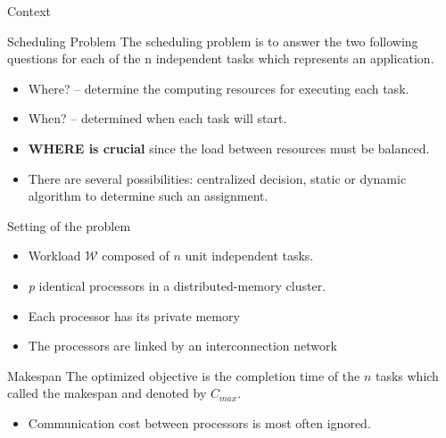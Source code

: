 \documentclass{beamer}
\begin{document}
\begin{frame}{Context}
    \begin{block}{Scheduling Problem}
        The scheduling problem is to answer the two following questions
        for each of the n independent tasks which represents an application.
        \begin{itemize}
            \item \alert{Where?} – determine the computing resources for executing each task.
            \item \alert{When?} – determined when each task will start. 

        \end{itemize}
    \end{block}
\bigskip

    \begin{itemize}
        \item \textbf{WHERE is crucial} since the load between resources must be balanced. 
        \item There are several possibilities: centralized decision, static or dynamic algorithm to determine such an assignment.

    \end{itemize}
\end{frame}




\begin{frame}{Setting of the problem}
    \begin{itemize}
        \item { Workload $\mathcal{W}$ composed of $n$ unit independent tasks.}
        \item { \emph{p} identical processors in a distributed-memory cluster.  }                                     
        \item { Each processor has its private memory}
        \item { The processors are linked by an interconnection network}                                     
    \end{itemize}
        
        \begin{block}{Makespan}
            The optimized objective is the completion time of the $n$ tasks which called the \alert{makespan} and denoted by \alert{$C_{max}$}.
        \end{block}
        
     \begin{itemize}
         \item \alert{ Communication cost between processors is most often ignored. }                                     
     \end{itemize}

\end{frame}
\end{document}
